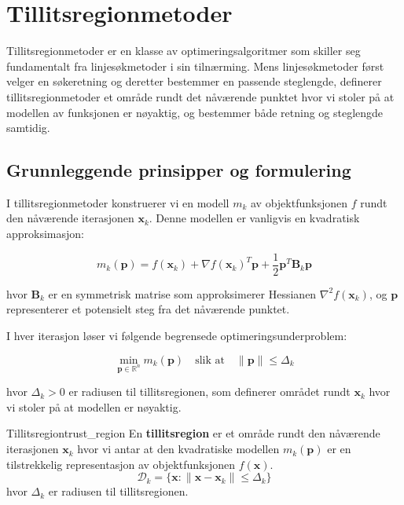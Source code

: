 \section{Tillitsregionmetoder}
\label{sec:trust_region_methods}

Tillitsregionmetoder er en klasse av optimeringsalgoritmer som skiller seg fundamentalt fra linjesøkmetoder i sin tilnærming. Mens linjesøkmetoder først velger en søkeretning og deretter bestemmer en passende steglengde, definerer tillitsregionmetoder et område rundt det nåværende punktet hvor vi stoler på at modellen av funksjonen er nøyaktig, og bestemmer både retning og steglengde samtidig.

\subsection{Grunnleggende prinsipper og formulering}
\label{subsec:trust_region_principles}

I tillitsregionmetoder konstruerer vi en modell \(m_k\) av objektfunksjonen \(f\) rundt den nåværende iterasjonen \(\symbf{x}_k\). Denne modellen er vanligvis en kvadratisk approksimasjon:

\begin{equation}
	m_k(\symbf{p}) = f(\symbf{x}_k) + \nabla f(\symbf{x}_k)^T\symbf{p} + \frac{1}{2}\symbf{p}^T\symbf{B}_k\symbf{p}
\end{equation}

hvor \(\symbf{B}_k\) er en symmetrisk matrise som approksimerer Hessianen \(\nabla^2 f(\symbf{x}_k)\), og \(\symbf{p}\) representerer et potensielt steg fra det nåværende punktet.

I hver iterasjon løser vi følgende begrensede optimeringsunderproblem:

\begin{equation}
	\min_{\symbf{p} \in \mathbb{R}^n} m_k(\symbf{p}) \quad \text{slik at} \quad \|\symbf{p}\| \leq \Delta_k
\end{equation}

hvor \(\Delta_k > 0\) er radiusen til tillitsregionen, som definerer området rundt \(\symbf{x}_k\) hvor vi stoler på at modellen er nøyaktig.

\begin{definition}{Tillitsregion}{trust_region}
	En \textbf{tillitsregion} er et område rundt den nåværende iterasjonen \( \symbf{x}_k \) hvor vi antar at den kvadratiske modellen \( m_k(\symbf{p}) \) er en tilstrekkelig representasjon av objektfunksjonen \( f(\symbf{x}) \).
	\[
		\mathcal{D}_k = \{\symbf{x} : \|\symbf{x} - \symbf{x}_k\| \leq \Delta_k\}
	\]
	hvor \( \Delta_k \) er radiusen til tillitsregionen.
\end{definition}


